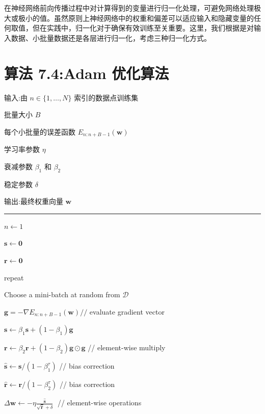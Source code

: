 \documentclass[10pt]{article}
\newcommand{\HRule}{\begin{center}\rule{0.9\linewidth}{0.2mm}\end{center}}
\begin{document}
在神经网络前向传播过程中对计算得到的变量进行归一化处理，可避免网络处理极大或极小的值。虽然原则上神经网络中的权重和偏差可以适应输入和隐藏变量的任何取值，但在实践中，归一化对于确保有效训练至关重要。这里，我们根据是对输入数据、小批量数据还是各层进行归一化，考虑三种归一化方式。

\section*{算法 7.4:Adam 优化算法}

输入:由 \(n \in  \{ 1,\ldots ,N\}\) 索引的数据点训练集

批量大小 \(B\)

每个小批量的误差函数 \({E}_{n : n + B - 1}\left( \mathbf{w}\right)\)

学习率参数 \(\eta\)

衰减参数 \({\beta }_{1}\) 和 \({\beta }_{2}\)

稳定参数 \(\delta\)

输出:最终权重向量 \(\mathbf{w}\)

\HRule

\(n \leftarrow  1\)

\(\mathbf{s} \leftarrow  \mathbf{0}\)

\(\mathbf{r} \leftarrow  \mathbf{0}\)

repeat

\hspace*{1em} Choose a mini-batch at random from \(\mathcal{D}\)

\hspace*{1em} \(\mathbf{g} =  - \nabla {E}_{n : n + B - 1}\left( \mathbf{w}\right) //\) evaluate gradient vector

\hspace*{1em} \(\mathbf{s} \leftarrow  {\beta }_{1}\mathbf{s} + \left( {1 - {\beta }_{1}}\right) \mathbf{g}\)

\hspace*{1em} \(\mathbf{r} \leftarrow  {\beta }_{2}\mathbf{r} + \left( {1 - {\beta }_{2}}\right) \mathbf{g} \odot  \mathbf{g}\) // element-wise multiply

\hspace*{1em} \(\widehat{\mathbf{s}} \leftarrow  \mathbf{s}/\left( {1 - {\beta }_{1}^{\tau }}\right)\) // bias correction

\hspace*{1em} \(\widehat{\mathbf{r}} \leftarrow  \mathbf{r}/\left( {1 - {\beta }_{2}^{\tau }}\right)\) // bias correction

\hspace*{1em} \(\Delta \mathbf{w} \leftarrow   - \eta \frac{\widehat{\mathbf{s}}}{\sqrt{\widehat{\mathbf{r}}} + \delta }\;\) // element-wise operations
\end{document}
